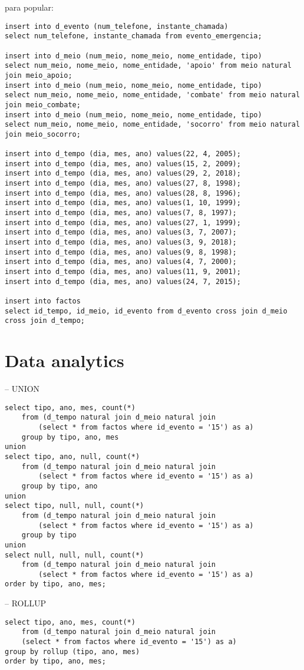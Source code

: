 \documentclass[10pt,a4paper]{article}
\begin{document}
para popular:
\begin{verbatim}
insert into d_evento (num_telefone, instante_chamada)
select num_telefone, instante_chamada from evento_emergencia;

insert into d_meio (num_meio, nome_meio, nome_entidade, tipo)
select num_meio, nome_meio, nome_entidade, 'apoio' from meio natural join meio_apoio;
insert into d_meio (num_meio, nome_meio, nome_entidade, tipo)
select num_meio, nome_meio, nome_entidade, 'combate' from meio natural join meio_combate;
insert into d_meio (num_meio, nome_meio, nome_entidade, tipo)
select num_meio, nome_meio, nome_entidade, 'socorro' from meio natural join meio_socorro;

insert into d_tempo (dia, mes, ano) values(22, 4, 2005);
insert into d_tempo (dia, mes, ano) values(15, 2, 2009);
insert into d_tempo (dia, mes, ano) values(29, 2, 2018);
insert into d_tempo (dia, mes, ano) values(27, 8, 1998);
insert into d_tempo (dia, mes, ano) values(28, 8, 1996);
insert into d_tempo (dia, mes, ano) values(1, 10, 1999);
insert into d_tempo (dia, mes, ano) values(7, 8, 1997);
insert into d_tempo (dia, mes, ano) values(27, 1, 1999);
insert into d_tempo (dia, mes, ano) values(3, 7, 2007);
insert into d_tempo (dia, mes, ano) values(3, 9, 2018);
insert into d_tempo (dia, mes, ano) values(9, 8, 1998);
insert into d_tempo (dia, mes, ano) values(4, 7, 2000);
insert into d_tempo (dia, mes, ano) values(11, 9, 2001);
insert into d_tempo (dia, mes, ano) values(24, 7, 2015);

insert into factos
select id_tempo, id_meio, id_evento from d_evento cross join d_meio cross join d_tempo;
\end{verbatim}


\section{Data analytics}
-- UNION
\begin{verbatim}
select tipo, ano, mes, count(*)
    from (d_tempo natural join d_meio natural join
        (select * from factos where id_evento = '15') as a) 
    group by tipo, ano, mes
union
select tipo, ano, null, count(*) 
    from (d_tempo natural join d_meio natural join
        (select * from factos where id_evento = '15') as a) 
    group by tipo, ano
union
select tipo, null, null, count(*) 
    from (d_tempo natural join d_meio natural join
        (select * from factos where id_evento = '15') as a) 
    group by tipo
union
select null, null, null, count(*) 
    from (d_tempo natural join d_meio natural join
        (select * from factos where id_evento = '15') as a)
order by tipo, ano, mes;
\end{verbatim}
-- ROLLUP
\begin{verbatim}
select tipo, ano, mes, count(*)
    from (d_tempo natural join d_meio natural join
    (select * from factos where id_evento = '15') as a)
group by rollup (tipo, ano, mes)
order by tipo, ano, mes;
\end{verbatim}
\end{document}

